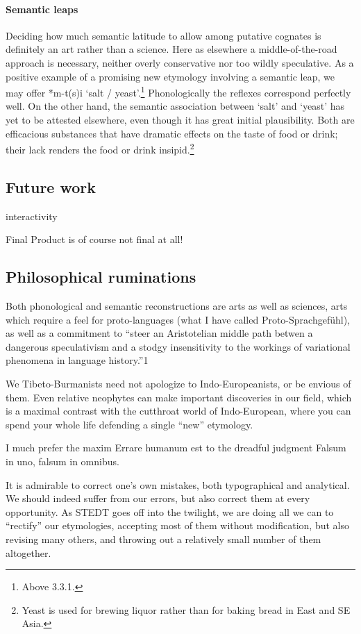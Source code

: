 \paragraph{Semantic leaps}
Deciding how much semantic latitude to allow among putative cognates is definitely an art rather than a science. Here as elsewhere a middle-of-the-road approach is necessary, neither overly conservative nor too wildly speculative. As a positive example of a promising new etymology involving a semantic leap, we may offer *m-t(s)i ‘salt / yeast’.\footnote{Above 3.3.1.} Phonologically the reflexes correspond perfectly well. On the other hand, the semantic association between ‘salt’ and ‘yeast’ has yet to be attested elsewhere, even though it has great initial plausibility. Both are efficacious substances that have dramatic effects on the taste of food or drink; their lack renders the food or drink insipid.\footnote{Yeast is used for brewing liquor rather than for baking bread in East and SE Asia.}


\subsection{Future work}

interactivity

Final Product is of course not final at all!


\subsection{Philosophical ruminations}

Both phonological and semantic reconstructions are arts as well as sciences, arts which require a feel for proto-languages (what I have called Proto-Sprachgef\"uhl), as well as a commitment to “steer an Aristotelian middle path betwen a dangerous speculativism and a stodgy insensitivity to the workings of variational phenomena in language history.”1 

We Tibeto-Burmanists need not apologize to Indo-Europeanists, or be envious of them. Even relative neophytes can make important discoveries in our field, which is a maximal contrast with the cutthroat world of Indo-European, where you can spend your whole life defending a single “new” etymology.

I much prefer the maxim Errare humanum est to the dreadful judgment Falsum in uno, falsum in omnibus.

It is admirable to correct one’s own mistakes, both typographical and analytical. We should indeed suffer from our errors, but also correct them at every opportunity. As STEDT goes off into the twilight, we are doing all we can to “rectify” our etymologies, accepting most of them without modification, but also revising many others, and throwing out a relatively small number of them altogether.

